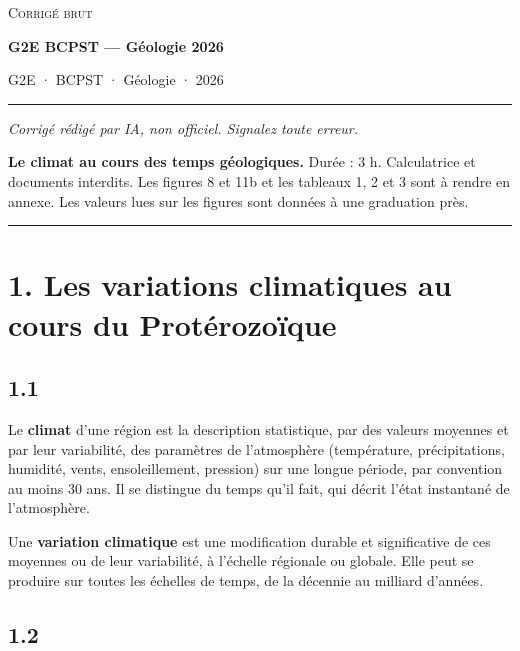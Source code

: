 \documentclass[11pt,a4paper]{article}
\begin{document}
\thispagestyle{plain}
\begin{center}
  {\small\scshape Corrigé brut}\par\smallskip
  {\LARGE\bfseries G2E BCPST — Géologie 2026\par}\medskip
  {\large G2E · BCPST · Géologie · 2026\par}
\end{center}
\vspace{2pt}\hrule\vspace{8pt}

\emph{Corrigé rédigé par IA, non officiel. Signalez toute erreur.}

\textbf{Le climat au cours des temps géologiques.} Durée : 3 h. Calculatrice et documents interdits. Les figures 8 et 11b et les tableaux 1, 2 et 3 sont à rendre en annexe. Les valeurs lues sur les figures sont données à une graduation près.

\begin{center}\rule{0.5\linewidth}{0.5pt}\end{center}

\hypertarget{les-variations-climatiques-au-cours-du-protuxe9rozouxefque}{%
\section{1. Les variations climatiques au cours du Protérozoïque}\label{les-variations-climatiques-au-cours-du-protuxe9rozouxefque}}

\hypertarget{section}{%
\subsection{1.1}\label{section}}

Le \textbf{climat} d'une région est la description statistique, par des valeurs moyennes et par leur variabilité, des paramètres de l'atmosphère (température, précipitations, humidité, vents, ensoleillement, pression) sur une longue période, par convention au moins 30 ans. Il se distingue du temps qu'il fait, qui décrit l'état instantané de l'atmosphère.

Une \textbf{variation climatique} est une modification durable et significative de ces moyennes ou de leur variabilité, à l'échelle régionale ou globale. Elle peut se produire sur toutes les échelles de temps, de la décennie au milliard d'années.

\hypertarget{section-1}{%
\subsection{1.2}\label{section-1}}
\end{document}
